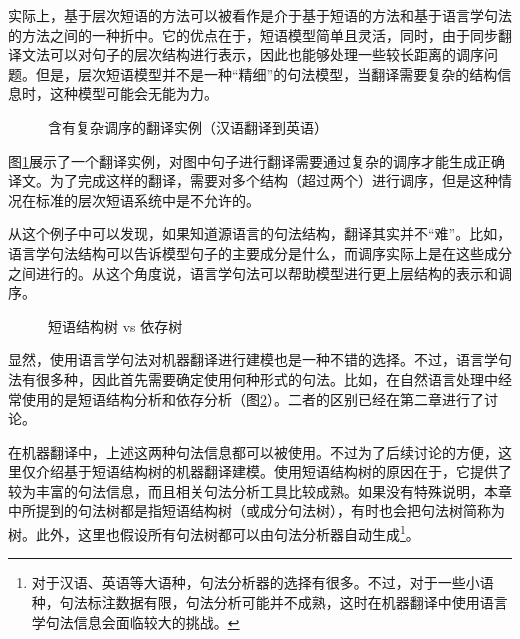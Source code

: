 \parinterval 实际上，基于层次短语的方法可以被看作是介于基于短语的方法和基于语言学句法的方法之间的一种折中。它的优点在于，短语模型简单且灵活，同时，由于同步翻译文法可以对句子的层次结构进行表示，因此也能够处理一些较长距离的调序问题。但是，层次短语模型并不是一种“精细”的句法模型，当翻译需要复杂的结构信息时，这种模型可能会无能为力。

\begin{figure}[htp]
\centering

\setlength{\belowcaptionskip}{-0.5em}
\caption{含有复杂调序的翻译实例（汉语翻译到英语）}
\label{fig:8-15}
\end{figure}

\parinterval 图\ref{fig:8-15}展示了一个翻译实例，对图中句子进行翻译需要通过复杂的调序才能生成正确译文。为了完成这样的翻译，需要对多个结构（超过两个）进行调序，但是这种情况在标准的层次短语系统中是不允许的。

\parinterval 从这个例子中可以发现，如果知道源语言的句法结构，翻译其实并不“难”。比如，语言学句法结构可以告诉模型句子的主要成分是什么，而调序实际上是在这些成分之间进行的。从这个角度说，语言学句法可以帮助模型进行更上层结构的表示和调序。

\begin{figure}[htp]
\centering

\setlength{\belowcaptionskip}{-1.0em}
\caption{短语结构树 vs 依存树}
\label{fig:8-16}
\end{figure}

\parinterval 显然，使用语言学句法对机器翻译进行建模也是一种不错的选择。不过，语言学句法有很多种，因此首先需要确定使用何种形式的句法。比如，在自然语言处理中经常使用的是短语结构分析和依存分析（图\ref{fig:8-16}）。二者的区别已经在第二章进行了讨论。

\parinterval 在机器翻译中，上述这两种句法信息都可以被使用。不过为了后续讨论的方便，这里仅介绍基于短语结构树的机器翻译建模。使用短语结构树的原因在于，它提供了较为丰富的句法信息，而且相关句法分析工具比较成熟。如果没有特殊说明，本章中所提到的句法树都是指短语结构树（或成分句法树），有时也会把句法树简称为树。此外，这里也假设所有句法树都可以由句法分析器自动生成\footnote[7]{对于汉语、英语等大语种，句法分析器的选择有很多。不过，对于一些小语种，句法标注数据有限，句法分析可能并不成熟，这时在机器翻译中使用语言学句法信息会面临较大的挑战。}。

